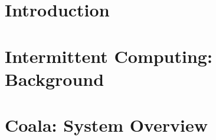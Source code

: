 \documentclass[sigplan,10pt,review,anonymous]{acmart}
\newcommand{\sys}{Coala\xspace}
\begin{document}



\maketitle

\section{Introduction}
\label{sec:intro}



\section{Intermittent Computing: Background}
\label{sec:background}



\section{\sys: System Overview}
\label{sec:overall_system}
\end{document}
